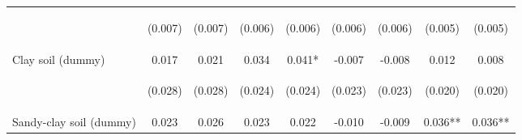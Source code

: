 \begin{center}
\begin{tabular}{lcccccccc}
\vspace{4pt} & \begin{footnotesize}(0.007)\end{footnotesize} & \begin{footnotesize}(0.007)\end{footnotesize} & \begin{footnotesize}(0.006)\end{footnotesize} & \begin{footnotesize}(0.006)\end{footnotesize} & \begin{footnotesize}(0.006)\end{footnotesize} & \begin{footnotesize}(0.006)\end{footnotesize} & \begin{footnotesize}(0.005)\end{footnotesize} & \begin{footnotesize}(0.005)\end{footnotesize} \\
Clay soil (dummy) & 0.017 & 0.021 & 0.034 & 0.041* & -0.007 & -0.008 & 0.012 & 0.008 \\
\vspace{4pt} & \begin{footnotesize}(0.028)\end{footnotesize} & \begin{footnotesize}(0.028)\end{footnotesize} & \begin{footnotesize}(0.024)\end{footnotesize} & \begin{footnotesize}(0.024)\end{footnotesize} & \begin{footnotesize}(0.023)\end{footnotesize} & \begin{footnotesize}(0.023)\end{footnotesize} & \begin{footnotesize}(0.020)\end{footnotesize} & \begin{footnotesize}(0.020)\end{footnotesize} \\
Sandy-clay soil (dummy) & 0.023 & 0.026 & 0.023 & 0.022 & -0.010 & -0.009 & 0.036** & 0.036** \\

\end{tabular}
\end{center}
